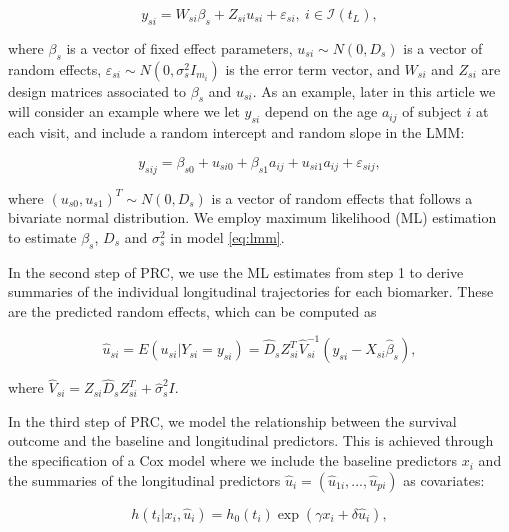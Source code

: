 \begin{equation}
y_{si} = W_{si} \beta_s + Z_{si} u_{si} + \varepsilon_{si}, \: i \in \mathcal{I}(t_L),
\label{eq:lmm}
\end{equation}

where \(\beta_s\) is a vector of fixed effect parameters,
\(u_{si} \sim N(0, D_s)\) is a vector of random effects,
\(\varepsilon_{si} \sim N(0, \sigma^2_s I_{m_i})\) is the error term
vector, and \(W_{si}\) and \(Z_{si}\) are design matrices associated to
\(\beta_s\) and \(u_{si}\). As an example, later in this article we will
consider an example where we let \(y_{si}\) depend on the age \(a_{ij}\)
of subject \(i\) at each visit, and include a random intercept and
random slope in the LMM:

\begin{equation}
y_{sij} = \beta_{s0} + u_{si0} + \beta_{s1} a_{ij} + u_{si1} a_{ij} + \varepsilon_{sij},
\label{eq:lmmwithslope}
\end{equation}

where \((u_{s0}, u_{s1})^T \sim N(0, D_s)\) is a vector of random
effects that follows a bivariate normal distribution. We employ maximum
likelihood (ML) estimation to estimate \(\beta_s\), \(D_s\) and
\(\sigma^2_s\) in model \eqref{eq:lmm}.

In the second step of PRC, we use the ML estimates from step 1 to derive
summaries of the individual longitudinal trajectories for each
biomarker. These are the predicted random effects, which can be computed
as

\begin{equation}
\hat{u}_{si} =E(u_{si} | Y_{si} = y_{si}) = 
\hat{D}_s Z_{si}^T \hat{V}_{si}^{-1} (y_{si} - X_{si} \hat{\beta}_s),
\label{eq:predranef}
\end{equation}

where \(\hat{V}_{si} = Z_{si} \hat{D}_s Z_{si}^T + \hat{\sigma}^2_s I\).

In the third step of PRC, we model the relationship between the survival
outcome and the baseline and longitudinal predictors. This is achieved
through the specification of a Cox model where we include the baseline
predictors \(x_i\) and the summaries of the longitudinal predictors
\(\hat{u}_i = (\hat{u}_{1i}, ..., \hat{u}_{pi})\) as covariates:

\begin{equation}
h(t_i | x_i, \hat{u}_i) = h_0(t_i) \exp \left( \gamma x_i + \delta \hat{u}_i \right),
\label{eq:cox}
\end{equation}

